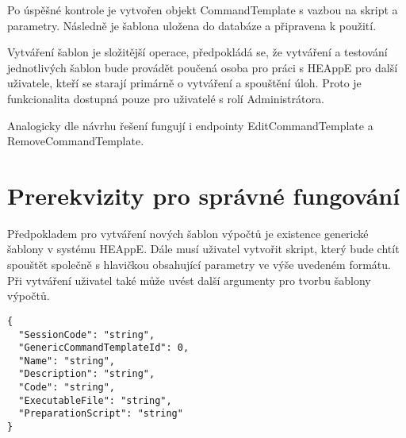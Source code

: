 Po úspěšné kontrole je vytvořen objekt CommandTemplate s vazbou na skript a parametry. Následně je šablona uložena do databáze a připravena k použití.

Vytváření šablon je složitější operace, předpokládá se, že vytváření a testování jednotlivých šablon bude provádět poučená osoba pro práci s HEAppE pro další uživatele, kteří se starají primárně o vytváření a spouštění úloh. Proto je funkcionalita dostupná pouze pro uživatelé s rolí Administrátora.

Analogicky dle návrhu řešení fungují i endpointy EditCommandTemplate a RemoveCommandTemplate.

\section{Prerekvizity pro správné fungování}
Předpokladem pro vytváření nových šablon výpočtů je existence generické šablony v systému HEAppE. Dále musí uživatel vytvořit skript, který bude chtít spouštět společně s hlavičkou obsahující parametry ve výše uvedeném formátu. Při vytváření uživatel také může uvést další argumenty pro tvorbu šablony výpočtů.



\begin{lstlisting}[caption={JSON struktura pro endpoint CreateCommandTemplate}]
{
  "SessionCode": "string",
  "GenericCommandTemplateId": 0,
  "Name": "string",
  "Description": "string",
  "Code": "string",
  "ExecutableFile": "string",
  "PreparationScript": "string"
} 
\end{lstlisting}



